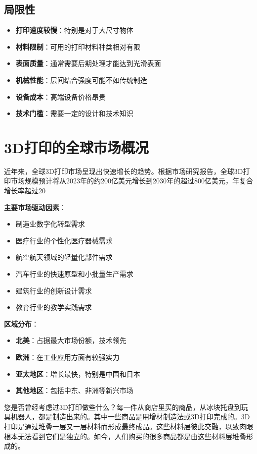 \documentclass[12pt,UTF8]{ctexbook}
\begin{document}
\subsection{局限性}
\begin{itemize}
\item \textbf{打印速度较慢}：特别是对于大尺寸物体
\item \textbf{材料限制}：可用的打印材料种类相对有限
\item \textbf{表面质量}：通常需要后期处理才能达到光滑表面
\item \textbf{机械性能}：层间结合强度可能不如传统制造
\item \textbf{设备成本}：高端设备价格昂贵
\item \textbf{技术门槛}：需要一定的设计和技术知识
\end{itemize}

\section{3D打印的全球市场概况}
近年来，全球3D打印市场呈现出快速增长的趋势。根据市场研究报告，全球3D打印市场规模预计将从2023年的约200亿美元增长到2030年的超过800亿美元，年复合增长率超过20%

\textbf{主要市场驱动因素}：
\begin{itemize}
\item 制造业数字化转型需求
\item 医疗行业的个性化医疗器械需求
\item 航空航天领域的轻量化部件需求
\item 汽车行业的快速原型和小批量生产需求
\item 建筑行业的创新设计需求
\item 教育行业的教学实践需求
\end{itemize}

\textbf{区域分布}：
\begin{itemize}
\item \textbf{北美}：占据最大市场份额，技术领先
\item \textbf{欧洲}：在工业应用方面有较强实力
\item \textbf{亚太地区}：增长最快，特别是中国和日本
\item \textbf{其他地区}：包括中东、非洲等新兴市场
\end{itemize}

您是否曾经考虑过3D打印做些什么？每一件从商店里买的商品，从冰块托盘到玩具机器人，都是制造出来的。其中一些商品是用增材制造法或3D打印完成的。3D打印是通过堆叠一层又一层材料而形成最终成品。这些材料层彼此交融，以致肉眼根本无法看到它们是独立的。如今，人们购买的很多商品都是由这些材料层堆叠形成的。
\end{document}
